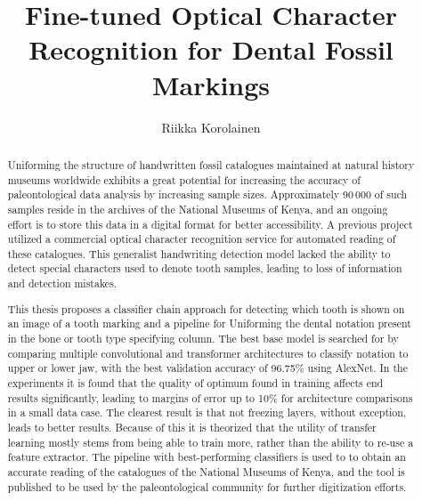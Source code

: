 \documentclass[english,twoside,openright]{UH_DS_MSc}
\title{Fine-tuned Optical Character Recognition for Dental Fossil Markings}
\author{Riikka Korolainen}
\date{\thesisdate}
\begin{document}
\maketitle


\begin{abstract}

Uniforming the structure of handwritten fossil catalogues maintained at natural history museums worldwide exhibits a great 
potential for increasing the accuracy of paleontological data analysis by increasing sample sizes. 
Approximately 90\,000 of such samples reside in the archives of the National Museums of Kenya, and 
an ongoing effort is to store this data in a digital format for better accessibility.
A previous project utilized a commercial optical character recognition service for automated reading of these catalogues. This generalist
handwriting detection model lacked the ability to detect special characters used to denote tooth samples,
 leading to loss of information and detection mistakes.

This thesis proposes a classifier chain approach for detecting which tooth is shown on an image of a tooth marking 
and a pipeline for Uniforming the dental notation present in 
the bone or tooth type specifying column. The best base model is searched for by comparing multiple convolutional and transformer architectures
to classify notation to upper or lower jaw, with the best validation accuracy of 96.75\% using AlexNet. 
In the experiments it is found that the quality of optimum found in training affects end results significantly,
leading to margins of error up to 10\% for architecture comparisons in a small data case.
The clearest result is that not freezing layers, without exception, leads to better results.
Because of this it is theorized that the utility of transfer learning mostly stems from 
being able to train more, rather than the ability to re-use a feature extractor.
The pipeline with best-performing classifiers is used to
to obtain an accurate reading of the catalogues of the National Museums of Kenya, and the tool is published to be used 
by the paleontological community for further digitization efforts.

\end{abstract}
\end{document}

